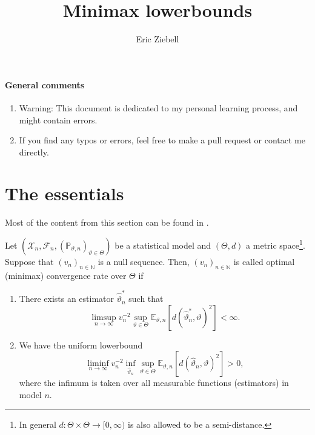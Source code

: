 \documentclass[a4paper]{article}
\author{Eric Ziebell}
\title{Minimax lowerbounds}
\begin{document}
\maketitle

\paragraph{General comments}
\begin{enumerate}
\item Warning: This document is dedicated to my personal learning process, and might contain errors.
\item If you find any typos or errors, feel free to make a pull request or contact me directly. 
\end{enumerate}
\section{The essentials}
Most of the content from this section can be found in \citet[Chapter 2]{tsybakovIntroductionNonparametricEstimation2009}.
\begin{definition}
	Let $(\mathcal{X}_n, \mathcal{F}_n, (\mathbb{P}_{\vartheta,n})_{\vartheta \in \Theta})$ be a statistical model and $(\Theta, d)$ a metric space\footnote{In general $d:\Theta \times \Theta \rightarrow [0,\infty)$ is also allowed to be a semi-distance.}. Suppose that $(v_n)_{n \in \mathbb{N}}$ is a null sequence. Then, $(v_n)_{n \in \mathbb{N}}$ is called optimal (minimax) convergence rate over $\Theta$ if
	\begin{enumerate}
		\item There exists an estimator $\hat{\vartheta}_n^{*}$ such that
		      \begin{equation*}
			      \label{condition:upperbound}
			      \limsup_{n \rightarrow \infty} v_n^{-2} \sup_{\vartheta \in \Theta} \mathbb{E}_{\vartheta, n}[d(\hat{\vartheta}_n^{*}, \vartheta)^{2}]< \infty.
		      \end{equation*}
		\item We have the uniform lowerbound
		      \begin{equation*}
			      \liminf_{n \rightarrow \infty} v_n^{-2} \inf_{\hat{\vartheta}_n} \sup_{\vartheta \in \Theta} \mathbb{E}_{\vartheta,n}[d(\hat{\vartheta}_{n}, \vartheta)^{2}]>0,
		      \end{equation*}
		      where the infimum is taken over all measurable functions (estimators) in model $n$.
	\end{enumerate}
\end{definition}
\end{document}
